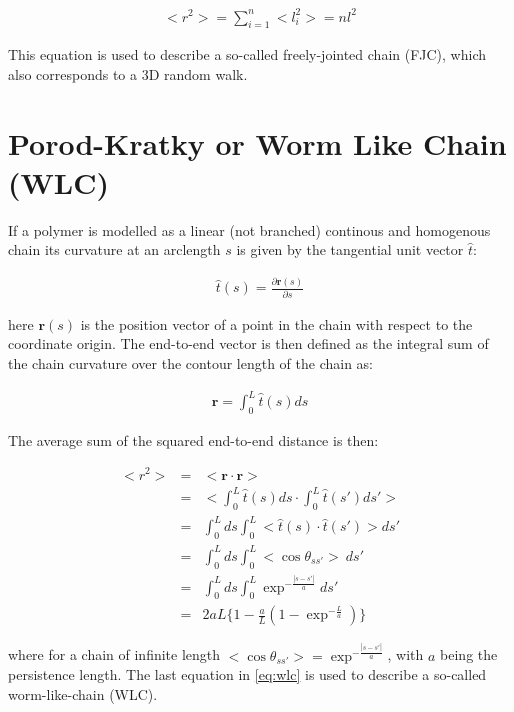 \begin{gather}
<r^2> = \sum_{i=1}^{n}<l_{i}^2> = nl^2
\end{gather}  

This equation is used to describe a so-called freely-jointed chain
(FJC), which also corresponds to a 3D random walk.

\section{Porod-Kratky or Worm Like Chain (WLC)}
If a polymer is modelled as a linear (not branched) continous and
homogenous chain its curvature at an arclength $s$ is given by the
tangential unit vector $\hat{t}$:

\begin{gather}
\hat{t}(s)=\frac{\partial{\textbf{r}(s)}}{\partial{s}}
\end{gather}

here $\textbf{r}(s)$ is the position vector of a point in the chain
with respect to the coordinate origin.
The end-to-end vector is then defined as the integral sum of the chain
curvature over the contour length of the chain as:

\begin{gather}
\textbf{r}=\int_{0}^{L}\hat{t}(s)ds
\end{gather}

The average sum of the squared end-to-end distance is then:

\begin{eqnarray}
\label{eq:wlc}
<r^2> & = & <\textbf{r} \cdot \textbf{r}> \nonumber \\
               & = & <\int_{0}^{L}\hat{t}(s)ds \cdot \int_{0}^{L}\hat{t}(s')ds' >\nonumber \\
               & = & \int_{0}^{L} ds \int_{0}^{L}<\hat{t}(s) \cdot \hat{t}(s')>ds' \nonumber \\
               & = & \int_{0}^{L} ds \int_{0}^{L} <\cos{\theta}_{ss'}>~ ds' \nonumber \\
               & = & \int_{0}^{L} ds \int_{0}^{L} \exp^{-\frac{|s-s'|}{a}} ds' \nonumber \\
               & = & 2aL \{ 1 - \frac{a}{L}(1-\exp^{-\frac{L}{a}})\}
\end{eqnarray}

where  for   a  chain  of  infinite   length  $<\cos{\theta_{ss'}}>  =
\exp^{-\frac{|s-s'|}{a}}$, with $a$ being the persistence length.  The
last   equation  in   \ref{eq:wlc}   is  used   to   describe  a   so-called
worm-like-chain (WLC).

